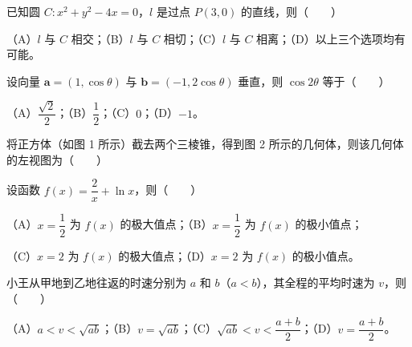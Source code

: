 \begin{question}
已知圆 $C:x^2+y^2-4x=0$，$l$ 是过点 $P(3,0)$ 的直线，则\mbox{（　　）}

（A）$l$ 与 $C$ 相交；（B）$l$ 与 $C$ 相切；（C）$l$ 与 $C$ 相离；（D）以上三个选项均有可能。

\end{question}
\begin{question}
设向量 $\boldsymbol a=(1,\cos\theta)$ 与 $\boldsymbol b=(-1,2\cos\theta)$ 垂直，则 $\cos2\theta$ 等于\mbox{（　　）}

（A）$\dfrac{\sqrt2}2$；（B）$\dfrac12$；（C）$0$；（D）$-1$。

\Needspace{0.4\textheight}
\end{question}
\begin{question}
将正方体（如图 1 所示）截去两个三棱锥，得到图 2 所示的几何体，则该几何体的左视图为\mbox{（　　）}
\nopagebreak[4]
\begin{center}\end{center}
\nopagebreak[4]
\end{question}
\begin{question}
设函数 $f(x)=\dfrac2x+\ln x$，则\mbox{（　　）}

（A）$x=\dfrac12$ 为 $f(x)$ 的极大值点；（B）$x=\dfrac12$ 为 $f(x)$ 的极小值点；

（C）$x=2$ 为 $f(x)$ 的极大值点；（D）$x=2$ 为 $f(x)$ 的极小值点。

\end{question}
\begin{question}
小王从甲地到乙地往返的时速分别为 $a$ 和 $b$（$a<b$），其全程的平均时速为 $v$，则\mbox{（　　）}

（A）$a<v<\sqrt{ab}$；（B）$v=\sqrt{ab}$；（C）$\sqrt{ab}<v<\dfrac{a+b}2$；（D）$v=\dfrac{a+b}2$。

\end{question}

